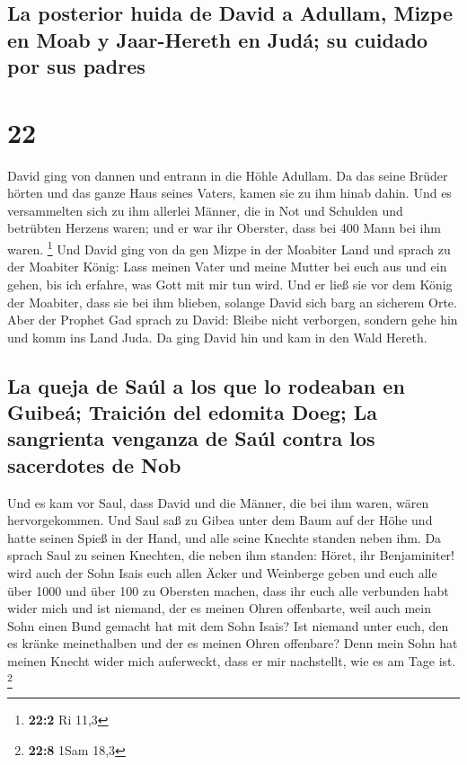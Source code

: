 \hypertarget{la-posterior-huida-de-david-a-adullam-mizpe-en-moab-y-jaar-hereth-en-juduxe1-su-cuidado-por-sus-padres}{%
\subsection{La posterior huida de David a Adullam, Mizpe en Moab y
Jaar-Hereth en Judá; su cuidado por sus
padres}\label{la-posterior-huida-de-david-a-adullam-mizpe-en-moab-y-jaar-hereth-en-juduxe1-su-cuidado-por-sus-padres}}

\hypertarget{section-21}{%
\section{22}\label{section-21}}

 David ging von dannen und entrann in die Höhle Adullam.
Da das seine Brüder hörten und das ganze Haus seines Vaters, kamen sie
zu ihm hinab dahin.  Und es versammelten sich zu ihm
allerlei Männer, die in Not und Schulden und betrübten Herzens waren;
und er war ihr Oberster, dass bei 400 Mann bei ihm waren. \footnote{\textbf{22:2}
  Ri 11,3}  Und David ging von da gen Mizpe in der
Moabiter Land und sprach zu der Moabiter König: Lass meinen Vater und
meine Mutter bei euch aus und ein gehen, bis ich erfahre, was Gott mit
mir tun wird.  Und er ließ sie vor dem König der Moabiter,
dass sie bei ihm blieben, solange David sich barg an sicherem Orte.
 Aber der Prophet Gad sprach zu David: Bleibe nicht
verborgen, sondern gehe hin und komm ins Land Juda. Da ging David hin
und kam in den Wald Hereth.

\hypertarget{la-queja-de-sauxfal-a-los-que-lo-rodeaban-en-guibeuxe1-traiciuxf3n-del-edomita-doeg-la-sangrienta-venganza-de-sauxfal-contra-los-sacerdotes-de-nob}{%
\subsection{La queja de Saúl a los que lo rodeaban en Guibeá; Traición
del edomita Doeg; La sangrienta venganza de Saúl contra los sacerdotes
de
Nob}\label{la-queja-de-sauxfal-a-los-que-lo-rodeaban-en-guibeuxe1-traiciuxf3n-del-edomita-doeg-la-sangrienta-venganza-de-sauxfal-contra-los-sacerdotes-de-nob}}

 Und es kam vor Saul, dass David und die Männer, die bei
ihm waren, wären hervorgekommen. Und Saul saß zu Gibea unter dem Baum
auf der Höhe und hatte seinen Spieß in der Hand, und alle seine Knechte
standen neben ihm.  Da sprach Saul zu seinen Knechten, die
neben ihm standen: Höret, ihr Benjaminiter! wird auch der Sohn Isais
euch allen Äcker und Weinberge geben und euch alle über 1000 und über
100 zu Obersten machen,  dass ihr euch alle verbunden habt
wider mich und ist niemand, der es meinen Ohren offenbarte, weil auch
mein Sohn einen Bund gemacht hat mit dem Sohn Isais? Ist niemand unter
euch, den es kränke meinethalben und der es meinen Ohren offenbare? Denn
mein Sohn hat meinen Knecht wider mich auferweckt, dass er mir
nachstellt, wie es am Tage ist. \footnote{\textbf{22:8} 1Sam 18,3}

